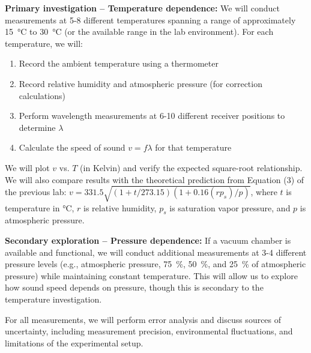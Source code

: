 \documentclass[12pt]{article}
\begin{document}
\textbf{Primary investigation -- Temperature dependence:}
We will conduct measurements at 5-8 different temperatures spanning a range of approximately \SI{15}{\celsius} to \SI{30}{\celsius} (or the available range in the lab environment). For each temperature, we will:
\begin{enumerate}
    \item Record the ambient temperature using a thermometer
    \item Record relative humidity and atmospheric pressure (for correction calculations)
    \item Perform wavelength measurements at 6-10 different receiver positions to determine $\lambda$
    \item Calculate the speed of sound $v = f\lambda$ for that temperature
\end{enumerate}
We will plot $v$ vs. $T$ (in Kelvin) and verify the expected square-root relationship. We will also compare results with the theoretical prediction from Equation (3) of the previous lab: $v = 331.5\sqrt{(1 + t/273.15)(1 + 0.16(rp_s)/p)}$, where $t$ is temperature in \si{\celsius}, $r$ is relative humidity, $p_s$ is saturation vapor pressure, and $p$ is atmospheric pressure.

\textbf{Secondary exploration -- Pressure dependence:}
If a vacuum chamber is available and functional, we will conduct additional measurements at 3-4 different pressure levels (e.g., atmospheric pressure, \SI{75}{\percent}, \SI{50}{\percent}, and \SI{25}{\percent} of atmospheric pressure) while maintaining constant temperature. This will allow us to explore how sound speed depends on pressure, though this is secondary to the temperature investigation.

For all measurements, we will perform error analysis and discuss sources of uncertainty, including measurement precision, environmental fluctuations, and limitations of the experimental setup.
\end{document}
